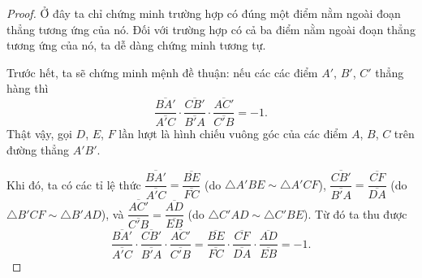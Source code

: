 \documentclass{article} %
\begin{document}
        \begin{proof}
            Ở đây ta chỉ chứng minh trường hợp có đúng một điểm nằm ngoài đoạn thẳng tương ứng của nó. Đối với trường hợp có cả ba điểm nằm ngoài đoạn thẳng tương ứng của nó, ta dễ dàng chứng minh tương tự.

            Trước hết, ta sẽ chứng minh mệnh đề thuận: nếu các các điểm \(A'\), \(B'\), \(C'\) thẳng hàng thì
            \[\frac{\overline{BA'}}{\overline{A'C}} \cdot \frac{\overline{CB'}}{\overline{B'A}} \cdot \frac{\overline{AC'}}{\overline{C'B}} = -1.\]
            Thật vậy, gọi \(D\), \(E\), \(F\) lần lượt là hình chiếu vuông góc của các điểm \(A\), \(B\), \(C\) trên đường thẳng \(A'B'\). 
            
            Khi đó, ta có các tỉ lệ thức \(\dfrac{\overline{BA'}}{\overline{A'C}} = \dfrac{\overline{BE}}{\overline{FC}}\) (do \(\triangle A'BE \sim \triangle A'CF\)), \(\dfrac{\overline{CB'}}{\overline{B'A}} = \dfrac{\overline{CF}}{\overline{DA}}\) (do \(\triangle B'CF \sim \triangle B'AD\)), và \(\dfrac{\overline{AC'}}{\overline{C'B}} = \dfrac{\overline{AD}}{\overline{EB}}\) (do \(\triangle C'AD \sim \triangle C'BE\)). Từ đó ta thu được
            \[\frac{\overline{BA'}}{\overline{A'C}} \cdot \frac{\overline{CB'}}{\overline{B'A}} \cdot \frac{\overline{AC'}}{\overline{C'B}} = \frac{\overline{BE}}{\overline{FC}} \cdot \frac{\overline{CF}}{\overline{DA}} \cdot \frac{\overline{AD}}{\overline{EB}} = -1.\]


\end{proof}
\end{document}
